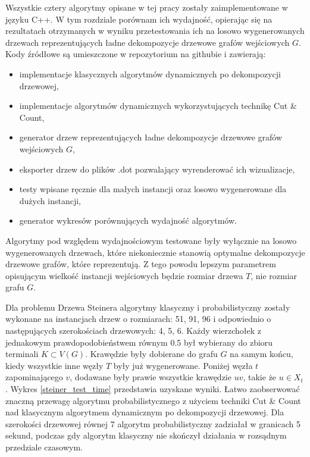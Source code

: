 \documentclass[12pt, oneside]{report}
\begin{document}
Wszystkie cztery algorytmy opisane w tej pracy zostały zaimplementowane w języku C++. W tym rozdziale porównam ich wydajność, opierając się na rezultatach otrzymanych w wyniku przetestowania ich na losowo wygenerowanych drzewach reprezentujących ładne dekompozycje drzewowe grafów wejściowych $G$. Kody źródłowe są umieszczone w repozytorium na githubie \cite{github} i zawierają: 
\begin{itemize}[label=$-$]
\item implementacje klasycznych algorytmów dynamicznych po dekompozycji drzewowej,
\item implementacje algorytmów dynamicznych wykorzystujących technikę Cut \& Count,
\item generator drzew reprezentujących ładne dekompozycje drzewowe grafów wejściowych $G$,
\item eksporter drzew do plików .dot pozwalający wyrenderować ich wizualizacje,
\item testy wpisane ręcznie dla małych instancji oraz losowo wygenerowane dla dużych instancji,  
\item generator wykresów porównujących wydajność algorytmów.
\end{itemize}  

Algorytmy pod względem wydajnościowym testowane były wyłącznie na losowo wygenerowanych drzewach, które niekoniecznie stanowią optymalne dekompozycje drzewowe grafów, które reprezentują. Z tego powodu lepszym parametrem opisującym wielkość instancji wejściowych będzie rozmiar drzewa $T$, nie rozmiar grafu $G$.

Dla problemu Drzewa Steinera algorytmy klasyczny i probabilistyczny zostały wykonane na instancjach drzew o rozmiarach: 51, 91, 96 i odpowiednio o  następujących szerokościach drzewowych: 4, 5, 6. Każdy wierzchołek z jednakowym prawdopodobieństwem równym 0.5 był wybierany do zbioru terminali $K \subset V(G)$. Krawędzie były dobierane do grafu $G$ na samym końcu, kiedy wszystkie inne węzły $T$ były już wygenerowane. Poniżej węzła $t$ zapominającego $v$, dodawane były prawie wszystkie krawędzie $uv$, takie że $u \in X_t$. Wykres \ref{steiner_test_time} przedstawia uzyskane wyniki. Łatwo zaobserwować znaczną przewagę algorytmu probabilistycznego z użyciem techniki Cut \& Count nad klasycznym algorytmem dynamicznym po dekompozycji drzewowej. Dla szerokości drzewowej równej 7 algorytm probabilistyczny zadziałał w granicach 5 sekund, podczas gdy algorytm klasyczny nie skończył działania w rozsądnym przedziale czasowym. 
\end{document}
